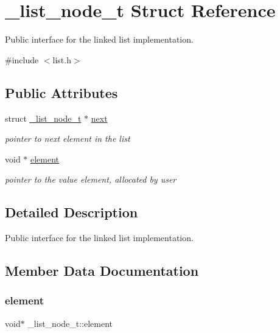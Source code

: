 \hypertarget{struct__list__node__t}{}\section{\+\_\+list\+\_\+node\+\_\+t Struct Reference}
\label{struct__list__node__t}


Public interface for the linked list implementation.  




{\ttfamily \#include $<$list.\+h$>$}

\subsection*{Public Attributes}
\begin{DoxyCompactItemize}
\item 
struct \hyperlink{struct__list__node__t}{\+\_\+list\+\_\+node\+\_\+t} $\ast$ \hyperlink{struct__list__node__t_a7e892551dbe86f632a09818435bdb459}{next}
\begin{DoxyCompactList}\small\item\em pointer to next element in the list \end{DoxyCompactList}\item 
void $\ast$ \hyperlink{struct__list__node__t_abea5f5c0727c725b8f3b21f14b45abf1}{element}
\begin{DoxyCompactList}\small\item\em pointer to the value element, allocated by user \end{DoxyCompactList}\end{DoxyCompactItemize}


\subsection{Detailed Description}
Public interface for the linked list implementation. 

\subsection{Member Data Documentation}
\hypertarget{struct__list__node__t_abea5f5c0727c725b8f3b21f14b45abf1}{}\label{struct__list__node__t_abea5f5c0727c725b8f3b21f14b45abf1} 
\subsubsection{\texorpdfstring{element}{element}}
{\footnotesize\ttfamily void$\ast$ \+\_\+list\+\_\+node\+\_\+t\+::element}




